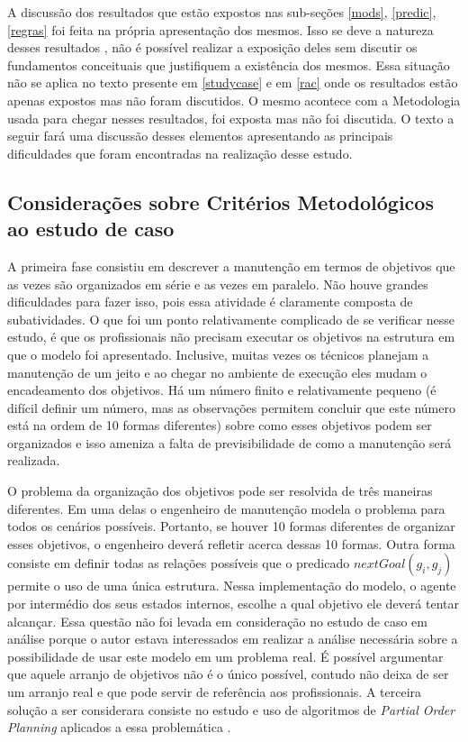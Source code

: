 A discussão dos resultados que estão expostos nas sub-seções \ref{mods}, \ref{predic}, \ref{regras} foi feita na própria apresentação dos mesmos. Isso se deve a natureza desses resultados , não é possível realizar a exposição deles sem discutir os fundamentos conceituais que justifiquem a existência dos mesmos. Essa situação não se aplica no texto presente em \ref{studycase} e em \ref{rac} onde os resultados estão apenas expostos mas não foram discutidos. O mesmo acontece com a Metodologia usada para chegar nesses resultados, foi exposta mas não foi discutida. O texto a seguir fará uma discussão desses elementos apresentando as principais dificuldades que foram encontradas na realização desse estudo. 

\subsection{Considerações sobre Critérios Metodológicos ao estudo de caso} \label{conscritmetcasoestudo}

A primeira fase consistiu em descrever a manutenção em termos de objetivos que as vezes são organizados em série e as vezes em paralelo. Não houve grandes dificuldades para fazer isso, pois essa atividade é claramente composta de subatividades. O que foi um ponto relativamente complicado de se verificar nesse estudo, é que os profissionais não precisam executar os objetivos na estrutura em que o modelo foi apresentado. Inclusive, muitas vezes os técnicos planejam a manutenção de um jeito e ao chegar no ambiente de execução eles mudam o encadeamento dos objetivos. Há um número finito e relativamente pequeno (é difícil definir um número, mas as observações permitem concluir que este número está na ordem de 10 formas diferentes) sobre como esses objetivos podem ser organizados e isso ameniza a falta de previsibilidade de como a manutenção será realizada. 

O problema da organização dos objetivos pode ser resolvida de três maneiras diferentes. Em uma delas o engenheiro de manutenção modela o problema para todos os cenários possíveis. Portanto, se houver 10 formas diferentes de organizar esses objetivos, o engenheiro deverá refletir acerca dessas 10 formas. Outra forma consiste em definir todas as relações possíveis que o predicado $nextGoal(g_i,g_j)$ permite o uso de uma única estrutura. Nessa implementação do modelo, o agente por intermédio dos seus estados internos, escolhe a qual objetivo ele deverá tentar alcançar. Essa questão não foi levada em consideração no estudo de caso em análise porque o autor estava interessados em realizar a análise necessária sobre a possibilidade de usar este modelo em um problema real. É possível argumentar que aquele arranjo de objetivos não é o único possível, contudo não deixa de ser um arranjo real e que pode servir de referência aos profissionais. A terceira solução a ser considerara consiste no estudo e uso de algoritmos de \textit{Partial Order Planning} aplicados a essa problemática \cite{planning}. 

